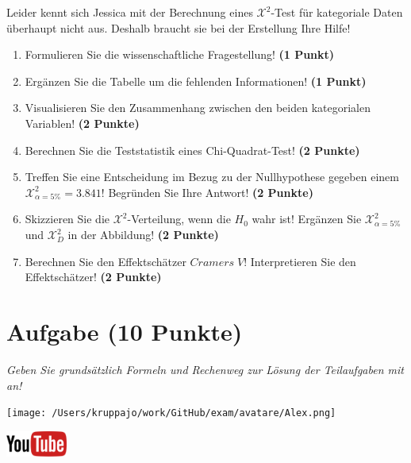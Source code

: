 \documentclass[a4paper, 9pt]{scrartcl}\usepackage[]{graphicx}\usepackage[]{xcolor}
\begin{document}
\vspace{5Ex}

Leider kennt sich Jessica mit der Berechnung eines $\mathcal{X}^2$-Test für kategoriale Daten überhaupt nicht aus. Deshalb braucht sie bei der Erstellung Ihre Hilfe!

\begin{enumerate}
\item Formulieren Sie die wissenschaftliche Fragestellung! \textbf{(1 Punkt)}
\item Ergänzen Sie die Tabelle um die fehlenden Informationen! \textbf{(1 Punkt)} 
\item Visualisieren Sie den Zusammenhang zwischen den beiden kategorialen Variablen! \textbf{(2 Punkte)}
\item Berechnen Sie die Teststatistik eines Chi-Quadrat-Test! \textbf{(2 Punkte)}
\item Treffen Sie eine Entscheidung im Bezug zu der Nullhypothese gegeben
  einem $\mathcal{X}^2_{\alpha = 5\%} = 3.841$! Begründen Sie Ihre Antwort!
  \textbf{(2 Punkte)}
\item Skizzieren Sie die $\mathcal{X}^2$-Verteilung, wenn die $H_0$ wahr ist! Ergänzen Sie  $\mathcal{X}^2_{\alpha = 5\%}$ und $\mathcal{X}^2_{D}$ in der Abbildung! \textbf{(2 Punkte)}
\item Berechnen Sie den Effektschätzer $Cramers\; V$! Interpretieren Sie den
  Effektschätzer! \textbf{(2 Punkte)}
\end{enumerate} 
\clearpage

\section{Aufgabe \hfill (10 Punkte)}

\textit{Geben Sie grundsätzlich Formeln und Rechenweg zur Lösung der Teilaufgaben mit an!} \\[1Ex]
 

 
\begin{minipage}[t]{0.5\textwidth}
\texttt{[image: /Users/kruppajo/work/GitHub/exam/avatare/Alex.png]}
\end{minipage}
\begin{minipage}[t]{0.5\textwidth}
\hfill
\href{https://youtu.be/jakM7fHyZfU}{\includegraphics[width = 2cm]{img/youtube}}\\[1Ex]
\end{minipage}
\vspace{1ex}
\end{document}
